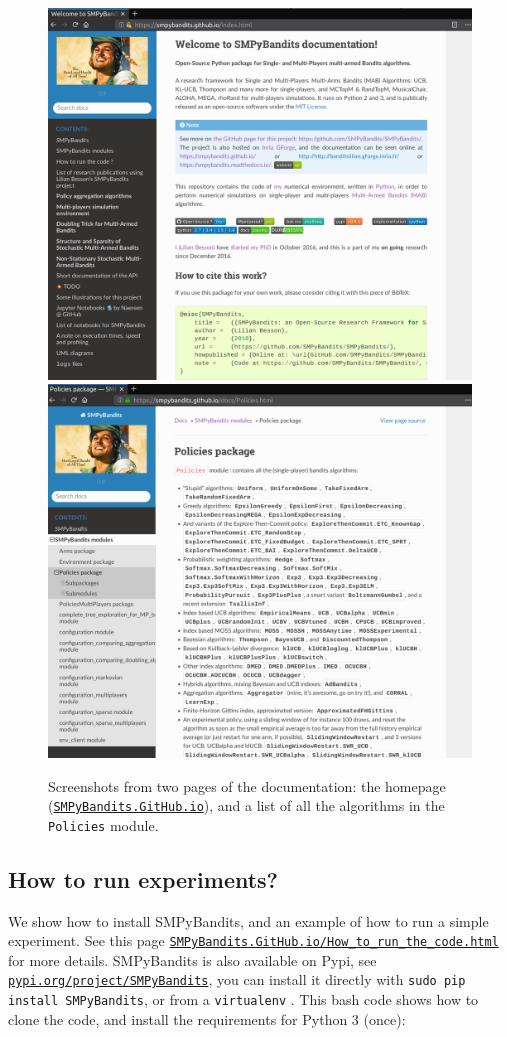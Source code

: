 \begin{figure}[h!]  %
    \centering
	\includegraphics[width=0.495\linewidth]{overview_documentation_1.png}
    \includegraphics[width=0.495\linewidth]{overview_documentation_2.png}
	\caption{Screenshots from two pages of the documentation: the homepage (\texttt{\href{https://SMPyBandits.GitHub.io}{SMPyBandits.GitHub.io}}), and a list of all the algorithms in the \texttt{Policies} module.}
	\label{fig:3:twoScreenshotsOfTheDocumentation}
\end{figure}



\subsection{How to run experiments?}

We show how to install SMPyBandits, and an example of how to run a simple experiment.
See this page \texttt{\href{https://SMPyBandits.GitHub.io/How_to_run_the_code.html}{SMPyBandits.GitHub.io/How\_to\_run\_the\_code.html}} for more details.
SMPyBandits is also available on Pypi, see \texttt{\href{https://pypi.org/project/SMPyBandits/}{pypi.org/project/SMPyBandits}}, you can install it directly with \texttt{sudo pip install SMPyBandits}, or from a \texttt{virtualenv} \cite{virtualenv}.
This bash code shows how to clone the code, and install the requirements for Python 3 (once):

